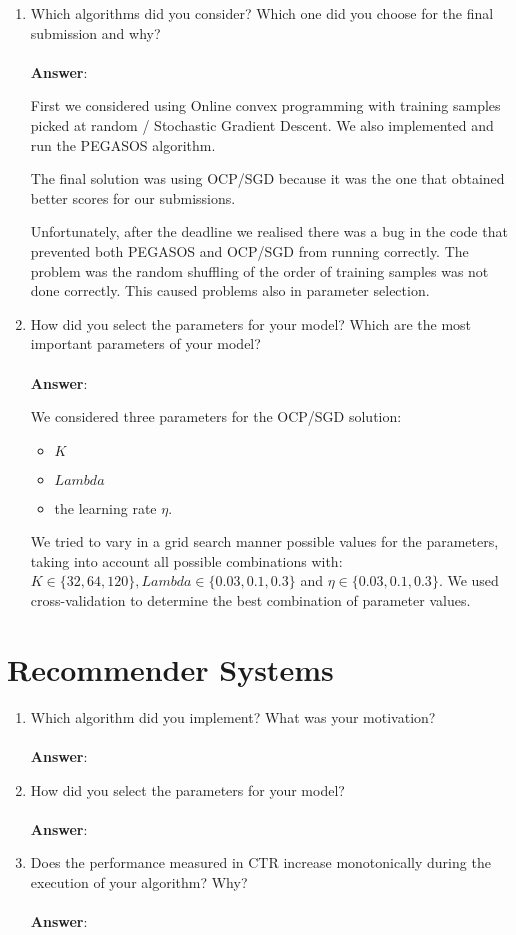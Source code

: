 \documentclass[11pt]{article}
\begin{document}
\begin{enumerate}
\item Which algorithms did you consider? Which one did you choose for the
  final submission and why? \\ \\
\textbf{Answer}:

First we considered using Online convex programming with training samples picked at random / Stochastic Gradient Descent. We also implemented and run
the PEGASOS algorithm. 

The final solution was using OCP/SGD because it was the one that obtained better scores for our submissions. 

Unfortunately, after the deadline we realised there was a bug in the code that prevented both PEGASOS and OCP/SGD from running correctly. The problem
was the random shuffling of the order of training samples was not done correctly. This caused problems also in parameter selection.

\item How did you select the parameters for your model? Which are the
  most important parameters of your model? \\ \\
\textbf{Answer}:

We considered three parameters for the OCP/SGD solution: 
\begin{itemize}
\item $K$
\item $Lambda$ 
\item the learning rate $\eta$.
\end{itemize}

We tried to vary in a grid search manner possible values for the parameters, taking into account all possible combinations with: $K \in \{32, 64, 120\}, Lambda \in \{0.03, 0.1, 0.3\}$ and $\eta \in \{0.03, 0.1, 0.3\}$. We used cross-validation to determine the best combination of parameter values.

\end{enumerate}

\section{Recommender Systems}

\begin{enumerate}
\item Which algorithm did you implement? What was your motivation? \\ \\
\textbf{Answer}:

\item How did you select the parameters for your model? \\ \\
\textbf{Answer}:

\item Does the performance measured in CTR increase monotonically during the
execution of your algorithm? Why? \\ \\
\textbf{Answer}:

\end{enumerate}
\end{document}
